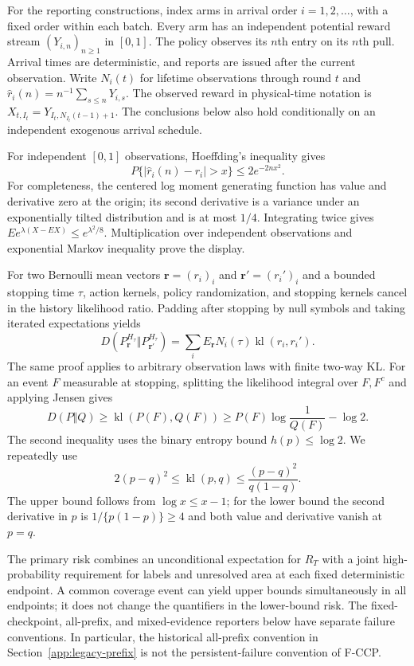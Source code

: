 \documentclass[11pt]{article}
\theoremstyle{remark}
\begin{document}
For the reporting constructions, index arms in arrival order
$i=1,2,\ldots$, with a fixed order within each batch.
Every arm has an independent potential reward stream $(Y_{i,n})_{n\ge1}$
in $[0,1]$. The policy observes its $n$th entry on its $n$th pull. Arrival
times are deterministic, and reports are issued after the current observation.
Write $N_i(t)$ for lifetime observations through round $t$ and
$\hat r_i(n)=n^{-1}\sum_{s\le n}Y_{i,s}$. The observed reward in physical-time notation is
$X_{t,I_t}=Y_{I_t,N_{I_t}(t-1)+1}$. The conclusions below also
hold conditionally on an independent exogenous arrival schedule.

For independent $[0,1]$ observations, Hoeffding's inequality gives
\[
 P\{|\hat r_i(n)-r_i|>x\}\le2e^{-2nx^2}.
\]
For completeness, the centered log moment generating function has value and
derivative zero at the origin; its second derivative is a variance under an
exponentially tilted distribution and is at most $1/4$. Integrating twice
gives $Ee^{\lambda(X-EX)}\le e^{\lambda^2/8}$. Multiplication over independent
observations and exponential Markov inequality prove the display.

For two Bernoulli mean vectors $\boldsymbol r=(r_i)_i$ and
$\boldsymbol r'=(r_i')_i$ and a bounded stopping time $\tau$, action
kernels, policy randomization, and stopping kernels cancel in the history
likelihood ratio. Padding after stopping by null symbols and taking iterated
expectations yields
\begin{equation}
 D(P_{\boldsymbol r}^{H_\tau}\Vert P_{\boldsymbol r'}^{H_\tau})
 =\sum_iE_{\boldsymbol r} N_i(\tau)\operatorname{kl}(r_i,r_i').
 \label{eq:app_kl_identity}
\end{equation}
The same proof applies to arbitrary observation laws with finite two-way KL.
For an event $F$ measurable at stopping, splitting the likelihood integral
over $F,F^c$ and applying Jensen gives
\[
 D(P\Vert Q)\ge\operatorname{kl}(P(F),Q(F))
 \ge P(F)\log\frac1{Q(F)}-\log2.
\]
The second inequality uses the binary entropy bound $h(p)\le\log2$. We repeatedly use
\[
 2(p-q)^2\le\operatorname{kl}(p,q)
 \le\frac{(p-q)^2}{q(1-q)}.
\]
The upper bound follows from $\log x\le x-1$; for the lower bound the second
derivative in $p$ is $1/\{p(1-p)\}\ge4$ and both value and derivative vanish
at $p=q$.


The primary risk combines an unconditional expectation for $R_T$ with a
joint high-probability requirement for labels and unresolved area at each
fixed deterministic endpoint. A common coverage event can yield upper
bounds simultaneously in all endpoints; it does not change the quantifiers
in the lower-bound risk. The fixed-checkpoint, all-prefix, and mixed-evidence
reporters below have separate failure conventions. In particular, the
historical all-prefix convention in Section~\ref{app:legacy-prefix} is not
the persistent-failure convention of F-CCP.
\end{document}
